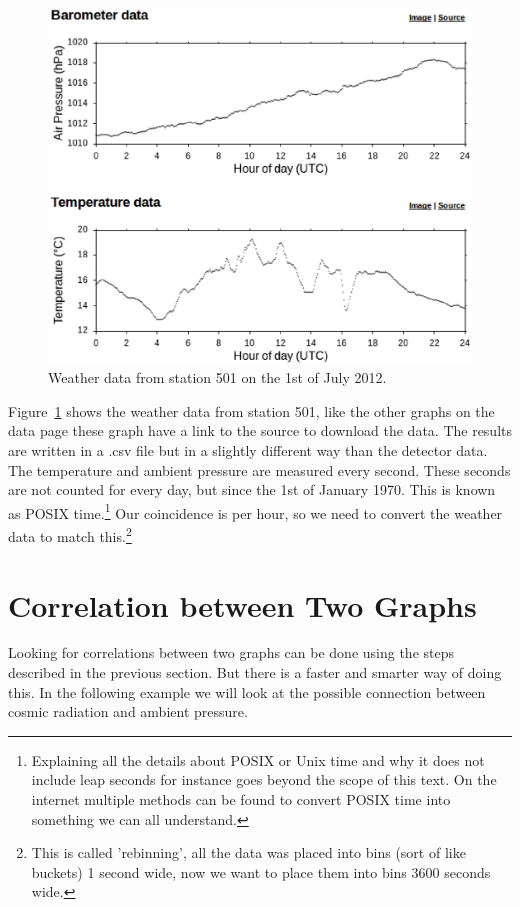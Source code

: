 \documentclass[12pt,a4paper]{article}
\numberwithin{equation}{section}
\numberwithin{figure}{section}
\numberwithin{table}{section}
\begin{document}
\begin{figure}\begin{center}
\includegraphics[scale=0.7]{501_weather.eps}
\caption{Weather data from station 501 on the 1st of July 2012.}\label{fig:501_weather}
\end{center}\end{figure}

Figure~\ref{fig:501_weather} shows the weather data from station 501, like the other graphs on the data page these graph have a link to the source to download the data. The results are written in a .csv file but in a slightly different way than the detector data. The temperature and ambient pressure are measured every second. These seconds are not counted for every day, but since the 1st of January 1970. This is known as POSIX time.\footnote{Explaining all the details about POSIX or Unix time and why it does not include leap seconds for instance goes beyond the scope of this text. On the internet multiple methods can be found to convert POSIX time into something we can all understand.} Our coincidence is per hour, so we need to convert the weather data to match this.\footnote{This is called 'rebinning', all the data was placed into bins (sort of like buckets) 1 second wide, now we want to place them into bins 3600 seconds wide.}

\section{Correlation between Two Graphs}
Looking for correlations between two graphs can be done using the steps described in the previous section. But there is a faster and smarter way of doing this. In the following example we will look at the possible connection between cosmic radiation and ambient pressure.
\end{document}

